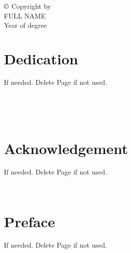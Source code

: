 \documentclass[11pt, twoside]{report}
\begin{document}



\newpage
\hspace{0pt}
\vfill
\noindent \Large{$\copyright$ Copyright by \\
FULL NAME\\
Year of degree
}
\vfill
\hspace{0pt}
\newpage

\chapter*{Dedication}
{If needed. Delete Page if not used.}

\newpage \ \newpage



\newpage \ \newpage

\chapter*{Acknowledgement}
{If needed. Delete Page if not used.}

\newpage \ \newpage
\chapter*{Preface}
{If needed. Delete Page if not used.}

\tableofcontents
\newpage \ \newpage





\newpage \ \newpage

\listoffigures
\newpage \ \newpage

\listoftables

\newpage \ \newpage









\appendix




\end{document}
